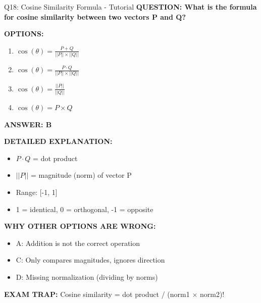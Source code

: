 \documentclass[8pt]{beamer}
\begin{document}
	\begin{frame}{Q18: Cosine Similarity Formula - Tutorial}
		\fontsize{6.5}{7.5}\selectfont
		\textbf{QUESTION: What is the formula for cosine similarity between two vectors P and Q?}
		
		\vspace{0.1cm}
		\textbf{OPTIONS:}
		\begin{enumerate}
			\item $\cos(\theta) = \frac{P + Q}{||P|| \times ||Q||}$
			\item $\cos(\theta) = \frac{P \cdot Q}{||P|| \times ||Q||}$
			\item $\cos(\theta) = \frac{||P||}{||Q||}$
			\item $\cos(\theta) = P \times Q$
		\end{enumerate}
		
		\vspace{0.1cm}
		\textcolor{myblue}{\textbf{ANSWER: B}}
		
		\vspace{0.1cm}
		\textbf{DETAILED EXPLANATION:}
		\begin{itemize}
			\item $P \cdot Q$ = dot product
			\item $||P||$ = magnitude (norm) of vector P
			\item Range: [-1, 1]
			\item 1 = identical, 0 = orthogonal, -1 = opposite
		\end{itemize}
		
		\vspace{0.1cm}
		\textcolor{myred}{\textbf{WHY OTHER OPTIONS ARE WRONG:}}
		\begin{itemize}
			\item \textcolor{myred}{A:} Addition is not the correct operation
			\item \textcolor{myred}{C:} Only compares magnitudes, ignores direction
			\item \textcolor{myred}{D:} Missing normalization (dividing by norms)
		\end{itemize}
		
		\textcolor{myred}{\textbf{EXAM TRAP:}} Cosine similarity = \textcolor{myblue}{dot product / (norm1 $\times$ norm2)}!
	\end{frame}
	
\end{document}
